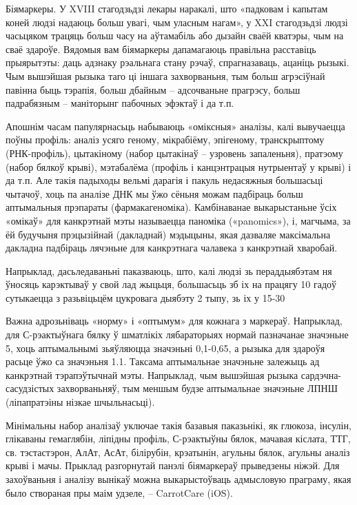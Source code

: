 Біямаркеры. У XVIII стагодзьдзі лекары наракалі, што «падковам і капытам коней людзі надаюць больш увагі, чым уласным нагам», у XXI стагодзьдзі людзі часьцяком трацяць больш часу на аўтамабіль або дызайн сваёй кватэры, чым на сваё здароўе. Вядомыя вам біямаркеры дапамагаюць правільна расставіць прыярытэты: даць адзнаку рэальнага стану рэчаў, спрагназаваць, ацаніць рызыкі. Чым вышэйшая рызыка таго ці іншага захворваньня, тым больш агрэсіўнай павінна быць тэрапія, больш дбайным – адсочваньне прагрэсу, больш падрабязным – маніторынг пабочных эфэктаў і да т.п.

Апошнім часам папулярнасьць набываюць «оміксныя» аналізы, калі вывучаецца поўны профіль: аналіз усяго геному, мікрабіёму, эпігеному, транскрыптому (РНК-профіль), цытакіному (набор цытакінаў – узровень запаленьня), пратэому (набор бялкоў крыві), мэтабалёма (профіль і канцэнтрацыя нутрыентаў у крыві) і да т.п. Але такія падыходы вельмі дарагія і пакуль недасяжныя большасьці чытачоў, хоць па аналізе ДНК мы ўжо сёньня можам падбіраць больш аптымальныя прэпараты (фармакагеноміка). Камбінаванае выкарыстаньне ўсіх «омікаў» для канкрэтнай мэты называецца паноміка («panomics»), і, магчыма, за ёй будучыня прэцызійнай (дакладнай) мэдыцыны, якая дазваляе максімальна дакладна падбіраць лячэньне для канкрэтнага чалавека з канкрэтнай хваробай.

Напрыклад, дасьледаваньні паказваюць, што, калі людзі зь пераддыябэтам ня ўносяць карэктываў у свой лад жыцьця, большасьць зб іх на працягу 10 гадоў сутыкаецца з разьвіцьцём цукровага дыябэту 2 тыпу, зь іх у 15-30%

Важна адрозьніваць «норму» і «оптымум» для кожнага з маркераў. Напрыклад, для С-рэактыўнага бялку ў шматлікіх лябараторыях нормай пазначанае значэньне 5, хоць аптымальнымі зьяўляюцца значэньні 0,1-0,65, а рызыка для здароўя расьце ўжо са значэньня 1.1. Таксама аптымальнае значэньне залежыць ад канкрэтнай тэрапэўтычнай мэты. Напрыклад, чым вышэйшая рызыка сардэчна-сасудзістых захворваньняў, тым меншым будзе аптымальнае значэньне ЛПНШ (ліпапратэіны нізкае шчыльнасьці).

Мінімальны набор аналізаў уключае такія базавыя паказьнікі, як глюкоза, інсулін, глікаваны гемаглябін, ліпідны профіль, С-рэактыўны бялок, мачавая кіслата, ТТГ, св. тэстастэрон, АлАт, АсАт, білірубін, крэатынін, агульны бялок, агульны аналіз крыві і мачы. Прыклад разгорнутай панэлі біямаркераў прыведзены ніжэй. Для захоўваньня і аналізу вынікаў можна выкарыстоўваць адмысловую праграму, якая было створаная пры маім удзеле, – CarrotCare (iOS).

